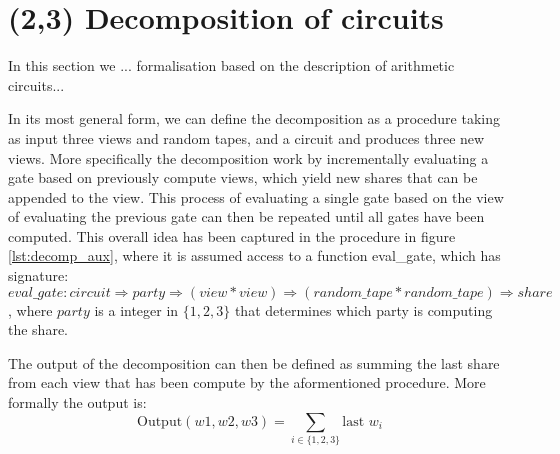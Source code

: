 


\section{(2,3) Decomposition of circuits}
\label{sec:decomposition}
In this section we ... formalisation based on the description of arithmetic circuits...

In its most general form, we can define the decomposition as a procedure taking
as input three views and random tapes, and a circuit and produces three new
views. 
More specifically the decomposition work by incrementally evaluating a gate based on
previously compute views, which yield new shares that can be appended to the
view. This process of evaluating a single gate based on the view of evaluating
the previous gate can then be repeated until all gates have been computed. This
overall idea has been captured in the procedure in figure \ref{lst:decomp_aux},
where it is assumed access to a function eval\_gate, which has signature:
$eval\_gate : circuit \Rightarrow party \Rightarrow (view * view) \Rightarrow (random\_tape * random\_tape) \Rightarrow share$,
where $party$ is a integer in $\{1,2,3\}$ that determines which party is
computing the share. 

The output of the decomposition can then be defined as summing the last share from each view that has been compute by the aformentioned procedure. More formally the output is:
\begin{equation}
  \text{Output}(w1, w2, w3) = \sum_{i \in \{1,2,3\}} \text{last } w_{i}
\end{equation}


